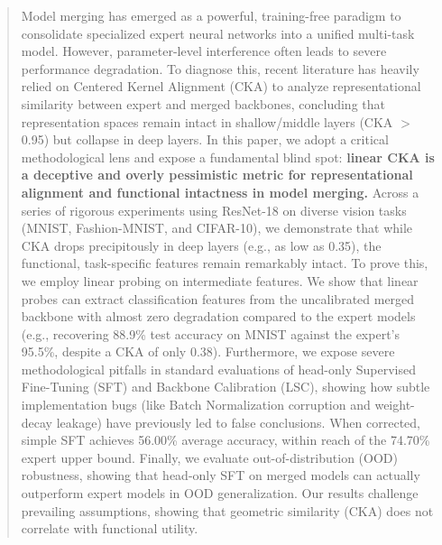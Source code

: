 \documentclass{article}
\theoremstyle{plain}
\theoremstyle{definition}
\theoremstyle{remark}
\begin{document}

\printAffiliationsAndNotice{}

\begin{abstract}
  Model merging has emerged as a powerful, training-free paradigm to consolidate specialized expert neural networks into a unified multi-task model. However, parameter-level interference often leads to severe performance degradation. To diagnose this, recent literature has heavily relied on Centered Kernel Alignment (CKA) to analyze representational similarity between expert and merged backbones, concluding that representation spaces remain intact in shallow/middle layers (CKA $>$ 0.95) but collapse in deep layers. In this paper, we adopt a critical methodological lens and expose a fundamental blind spot: \textbf{linear CKA is a deceptive and overly pessimistic metric for representational alignment and functional intactness in model merging.}
  Across a series of rigorous experiments using ResNet-18 on diverse vision tasks (MNIST, Fashion-MNIST, and CIFAR-10), we demonstrate that while CKA drops precipitously in deep layers (e.g., as low as 0.35), the functional, task-specific features remain remarkably intact. To prove this, we employ linear probing on intermediate features. We show that linear probes can extract classification features from the uncalibrated merged backbone with almost zero degradation compared to the expert models (e.g., recovering 88.9\% test accuracy on MNIST against the expert's 95.5\%, despite a CKA of only 0.38).
  Furthermore, we expose severe methodological pitfalls in standard evaluations of head-only Supervised Fine-Tuning (SFT) and Backbone Calibration (LSC), showing how subtle implementation bugs (like Batch Normalization corruption and weight-decay leakage) have previously led to false conclusions. When corrected, simple SFT achieves 56.00\% average accuracy, within reach of the 74.70\% expert upper bound. Finally, we evaluate out-of-distribution (OOD) robustness, showing that head-only SFT on merged models can actually outperform expert models in OOD generalization. Our results challenge prevailing assumptions, showing that geometric similarity (CKA) does not correlate with functional utility.
\end{abstract}
\end{document}
